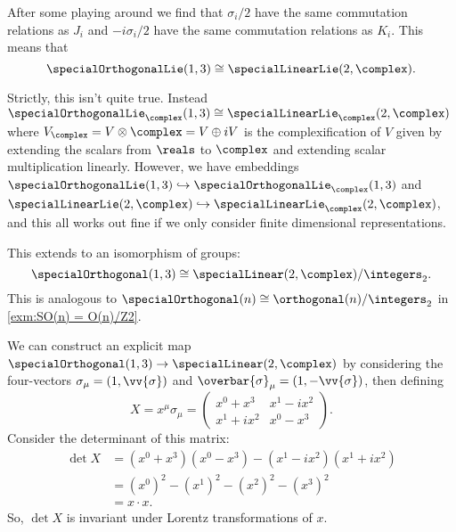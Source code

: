 \documentclass[fleqn]{NotesClass}
\newcommand{\cyclicGroupZ}[1][n]{\integers_{#1}}
\newcommand{\isomorphic}{\cong}
\begin{document}
    After some playing around we find that \(\sigma_i/2\) have the same commutation relations as \(J_i\) and \(-i\sigma_i/2\) have the same commutation relations as \(K_i\).
    This means that
    \begin{equation}
        \specialOrthogonalLie(1, 3) \isomorphic \specialLinearLie(2, \complex).
    \end{equation}
    \begin{wrn}
        Strictly, this isn't quite true. Instead \(\specialOrthogonalLie_{\complex}(1, 3) \isomorphic \specialLinearLie_{\complex}(2, \complex)\) where \(V_{\complex} = {V \otimes \complex} = V \oplus iV\) is the complexification of \(V\) given by extending the scalars from \(\reals\) to \(\complex\) and extending scalar multiplication linearly. However, we have embeddings \(\specialOrthogonalLie(1, 3) \hookrightarrow \specialOrthogonalLie_{\complex}(1, 3)\) and \(\specialLinearLie(2, \complex) \hookrightarrow \specialLinearLie_{\complex}(2, \complex)\), and this all works out fine if we only consider finite dimensional representations.
    \end{wrn}
    
    This extends to an isomorphism of groups:
    \begin{equation}
        \specialOrthogonal(1, 3) \isomorphic \specialLinear(2, \complex) / \cyclicGroupZ[2].
    \end{equation}
    This is analogous to \(\specialOrthogonal(n) \isomorphic \orthogonal(n)/\cyclicGroupZ[2]\) in \cref{exm:SO(n) = O(n)/Z2}.
    
    We can construct an explicit map \(\specialOrthogonal(1, 3) \to \specialLinear(2, \complex)\) by considering the four-vectors \(\sigma_\mu = (1, \vv{\sigma})\) and \(\overbar{\sigma}_\mu = (1, -\vv{\sigma})\), then defining
    \begin{equation}
        X = x^\mu \sigma_\mu = 
        \begin{pmatrix}
            x^0 + x^3 & x^1 - ix^2\\
            x^1 + ix^2 & x^0 - x^3
        \end{pmatrix}
        .
    \end{equation}
    Consider the determinant of this matrix:
    \begin{align}
        \det X &= (x^0 + x^3)(x^0 - x^3) - (x^1 - ix^2)(x^1 + ix^2)\\
        &= (x^0)^2 - (x^1)^2 - (x^2)^2 - (x^3)^2\\
        &= x \cdot x.
    \end{align}
    So, \(\det X\) is invariant under Lorentz transformations of \(x\).
    
\end{document}
